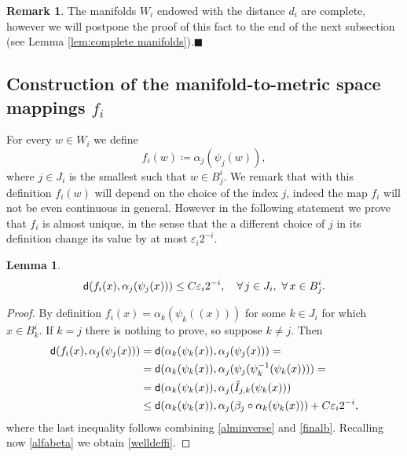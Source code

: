 \documentclass[11pt]{article}
\newcommand{\eps}{\varepsilon}
\newcommand{\sfd}{{\sf d}}
\newcommand{\fr}{\penalty-20\null\hfill$\blacksquare$}
\theoremstyle{plain}
\newtheorem{lemma}[theorem]{Lemma}
\theoremstyle{definition}
\newtheorem{remark}[theorem]{Remark}
\numberwithin{equation}{section}
\begin{document}
\begin{remark}\label{rmk:complete}
	The manifolds $W_i$ endowed with the distance $d_i$ are complete, however we will postpone the proof of this fact to the end of the next subsection (see Lemma \ref{lem:complete manifolds}).\fr
\end{remark}
\subsection{Construction of the manifold-to-metric space mappings \texorpdfstring{$f_i$}{fi}}\label{sec:manifold metric mappings}
	

For every $w\in W_i$ we define
\[f_i(w)\coloneqq \alpha_{j}(\psi_{j}(w)), \]
where $j \in J_i$  is the smallest such that $w\in B_j^i$.
We remark that with this definition $f_i(w)$ will depend on the choice of the index $j$, indeed the map $f_i$ will not be even continuous in general. 
However in the following statement we prove that  $f_i$ is almost unique, in the sense that the a different choice of $j$ in its definition change its value by at most $\eps_i2^{-i}. $
\begin{lemma}\label{welldeffii}
	\begin{equation}\label{welldeffi}
		\sfd(f_i(x),\alpha_{j}(\psi_{j}(x)))\le C\eps_i 2^{-i}, \quad \forall\, j \in J_i,\,\, \forall\, x \in B_j^i.
	\end{equation}
\end{lemma}
\begin{proof}
	By definition $f_i(x)=\alpha_k(\psi_k((x)))$ for some $k \in J_i$ for which $x \in B_k^i.$ If $k=j$ there is nothing to prove, so suppose $k \neq j.$ Then
	\begin{align*}
		\sfd(f_i(x),\alpha_{j}(\psi_j(x)))&=\sfd(\alpha_{k}(\psi_{k}(x)),\alpha_{j}(\psi_j(x)))=\\
		&=\sfd(\alpha_{k}(\psi_{k}(x)),\alpha_{j}(\psi_j(\psi_{k}^{-1}(\psi_{k}(x))))=\\
		&=\sfd(\alpha_{k}(\psi_{k}(x)),\alpha_{j}(\hat I_{j,k}(\psi_{k}(x)))\\
		&\le \sfd(\alpha_{k}(\psi_{k}(x)),\alpha_{j}(\beta_j\circ \alpha_k(\psi_{k}(x)))+C\eps_i2^{-i},
	\end{align*}
	where the last inequality follows combining \eqref{alminverse} and \eqref{finalb}.
	Recalling now \eqref{alfabeta} we obtain \eqref{welldeffi}.
\end{proof}
\end{document}
